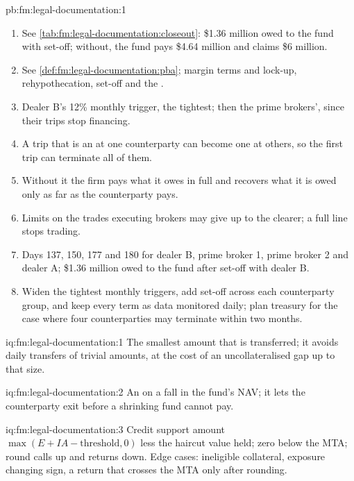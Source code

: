 \begin{solution}{pb:fm:legal-documentation:1}
\begin{enumerate}
\item See \cref{tab:fm:legal-documentation:closeout}: \$1.36 million owed to the fund with set-off; without, the fund pays \$4.64 million and claims
\$6 million.
\item See \cref{def:fm:legal-documentation:pba}; margin terms and lock-up, rehypothecation, set-off and the .
\item Dealer B's 12\% monthly trigger, the tightest; then the prime brokers', since their trips stop financing.
\item A trip that is an  at one counterparty can become one at others, so the first trip can terminate all of them.
\item Without it the firm pays what it owes in full and recovers what it is owed only as far as the counterparty pays.
\item Limits on the trades executing brokers may give up to the clearer; a full line stops trading.
\item Days 137, 150, 177 and 180 for dealer B, prime broker 1, prime broker 2 and dealer A; \$1.36 million owed to the fund after set-off with
dealer B.
\item Widen the tightest monthly triggers, add set-off across each counterparty group, and keep every term as data monitored daily; plan treasury
for the case where four counterparties may terminate within two months.
\end{enumerate}
\end{solution}

\begin{solution}{iq:fm:legal-documentation:1}
The smallest amount that is transferred; it avoids daily transfers of trivial amounts, at the cost of an uncollateralised gap up to that size.
\end{solution}

\begin{solution}{iq:fm:legal-documentation:2}
An  on a fall in the fund's NAV; it lets the counterparty exit before a shrinking fund cannot pay.
\end{solution}

\begin{solution}{iq:fm:legal-documentation:3}
Credit support amount $\max(E+IA-\text{threshold},0)$ less the haircut value held; zero below the MTA; round calls up and returns down. Edge cases:
ineligible collateral, exposure changing sign, a return that crosses the MTA only after rounding.
\end{solution}

